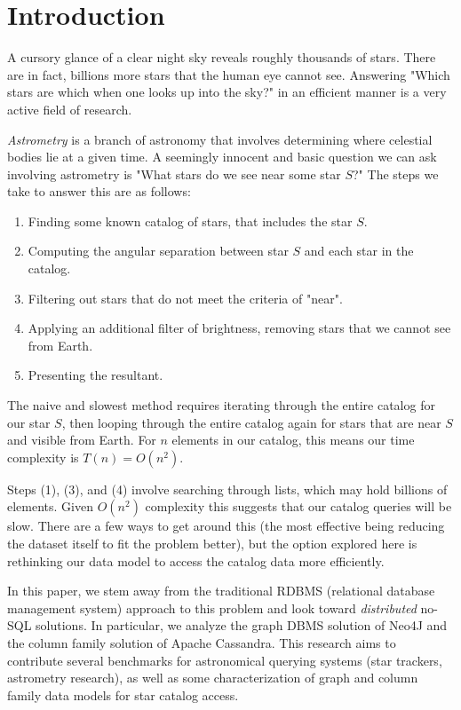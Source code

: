 \section{Introduction}\label{sec:introduction}
A cursory glance of a clear night sky reveals roughly thousands of stars.
There are in fact, billions more stars that the human eye cannot see.
Answering "Which stars are which when one looks up into the sky?" in an efficient manner is a very active field of
research.

\textit{Astrometry} is a branch of astronomy that involves determining where celestial
bodies lie at a given time.
A seemingly innocent and basic question we can ask involving astrometry is "What stars do we see near some star $S$?"
The steps we take to answer this are as follows:
\begin{enumerate}
    \item Finding some known catalog of stars, that includes the star $S$.
    \item Computing the angular separation between star $S$ and each star in the catalog.
    \item Filtering out stars that do not meet the criteria of "near".
    \item Applying an additional filter of brightness, removing stars that we cannot see from Earth.
    \item Presenting the resultant.
\end{enumerate}

The naive and slowest method requires iterating through the entire catalog for our star $S$, then looping through the
entire catalog again for stars that are near $S$ and visible from Earth.
For $n$ elements in our catalog, this means our time complexity is $T(n) = O\left( n^2 \right)$.

Steps (1), (3), and (4) involve searching through lists, which may hold billions of elements.
Given $O\left(n^2\right)$ complexity this suggests that our catalog queries will be slow.
There are a few ways to get around this (the most effective being reducing the dataset itself to fit the problem
better), but the option explored here is rethinking our data model to access the catalog data more efficiently.

In this paper, we stem away from the traditional RDBMS (relational database management system) approach to this
problem and look toward \textit{distributed} no-SQL solutions.
In particular, we analyze the graph DBMS solution of Neo4J and the column family solution of Apache Cassandra.
This research aims to contribute several benchmarks for astronomical querying systems (star trackers, astrometry
research), as well as some characterization of graph and column family data models for star catalog access.